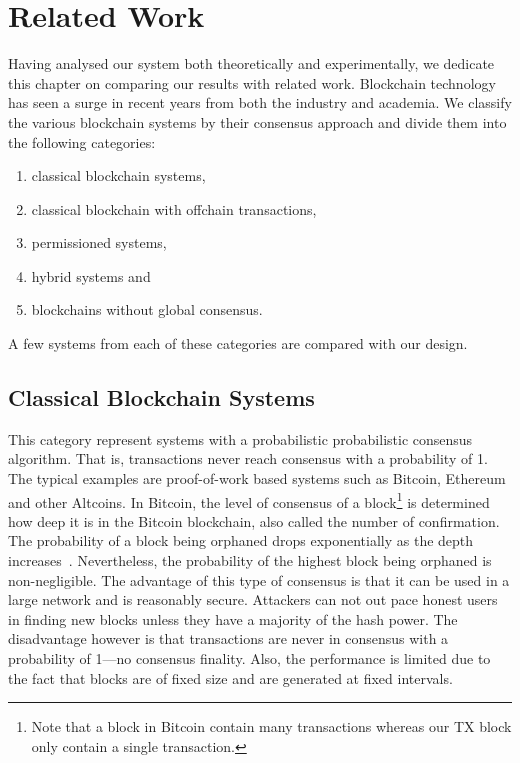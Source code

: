 \chapter{Related Work}
\label{ch:related}

Having analysed our system both theoretically and experimentally,
we dedicate this chapter on comparing our results with related work.
Blockchain technology has seen a surge in recent years from both the industry and academia.
We classify the various blockchain systems by their consensus approach and divide them into the following categories: 
\begin{enumerate}
    \item classical blockchain systems,
    \item classical blockchain with offchain transactions,
    \item permissioned systems,
    \item hybrid systems and
    \item blockchains without global consensus.
\end{enumerate}
A few systems from each of these categories are compared with our design.

\section{Classical Blockchain Systems}
This category represent systems with a probabilistic probabilistic consensus algorithm.
That is, transactions never reach consensus with a probability of 1.
The typical examples are proof-of-work based systems such as Bitcoin, Ethereum and other Altcoins.
In Bitcoin, the level of consensus of a block\footnote{Note that a block in Bitcoin contain many transactions whereas our TX block only contain a single transaction.}
is determined how deep it is in the Bitcoin blockchain, also called the number of confirmation.
The probability of a block being orphaned drops exponentially as the depth increases~\cite{bitcoin}.
Nevertheless, the probability of the highest block being orphaned is non-negligible.
The advantage of this type of consensus is that it can be used in a large network and is reasonably secure.
Attackers can not out pace honest users in finding new blocks unless they have a majority of the hash power.
The disadvantage however is that transactions are never in consensus with a probability of 1---no consensus finality.
Also, the performance is limited due to the fact that blocks are of fixed size and are generated at fixed intervals.


